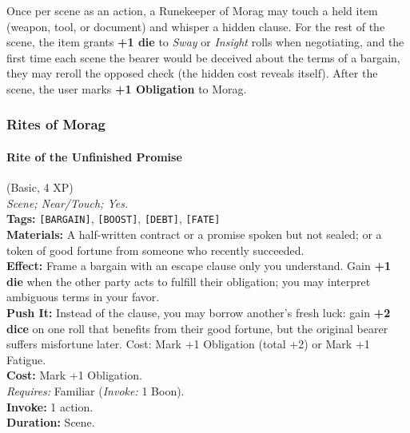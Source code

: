 Once per scene as an action, a Runekeeper of Morag may touch a held item (weapon, tool, or document) and whisper a hidden clause. For the rest of the scene, the item grants \textbf{+1 die} to \textit{Sway} or \textit{Insight} rolls when negotiating, and the first time each scene the bearer would be deceived about the terms of a bargain, they may reroll the opposed check (the hidden cost reveals itself). After the scene, the user marks \textbf{+1 Obligation} to Morag.

\subsubsection*{Rites of Morag}

\paragraph{Rite of the Unfinished Promise} (Basic, 4 XP) \hfill \\
\emph{Scene; Near/Touch; Yes.} \\
\textbf{Tags:} \texttt{[BARGAIN]}, \texttt{[BOOST]}, \texttt{[DEBT]}, \texttt{[FATE]} \\
\textbf{Materials:} A half-written contract or a promise spoken but not sealed; or a token of good fortune from someone who recently succeeded. \\
\textbf{Effect:} Frame a bargain with an escape clause only you understand. Gain \textbf{+1 die} when the other party acts to fulfill their obligation; you may interpret ambiguous terms in your favor. \\
\textbf{Push It:} Instead of the clause, you may borrow another's fresh luck: gain \textbf{+2 dice} on one roll that benefits from their good fortune, but the original bearer suffers misfortune later. Cost: Mark +1 Obligation (total +2) or Mark +1 Fatigue. \\
\textbf{Cost:} Mark +1 Obligation. \\
\textit{Requires:} Familiar (\textit{Invoke:} 1 Boon). \\
\textbf{Invoke:} 1 action. \\
\textbf{Duration:} Scene.

